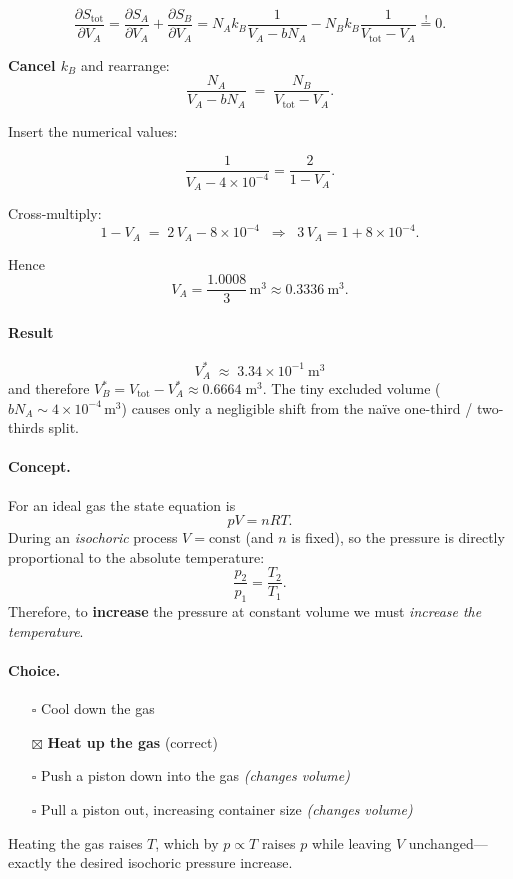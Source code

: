 \documentclass[12pt]{article}
\theoremstyle{definition} %
\theoremstyle{plain} %
\begin{document}
\[
  \frac{\partial S_{\text{tot}}}{\partial V_A}
  = \frac{\partial S_A}{\partial V_A}
    + \frac{\partial S_B}{\partial V_A}
  = N_A k_B \frac{1}{V_A - bN_A}
    - N_B k_B \frac{1}{V_{\text{tot}}-V_A}
  \stackrel{!}{=} 0 .
\]

\textbf{Cancel \(k_B\)} and rearrange:
\[
  \frac{N_A}{V_A - bN_A} \;=\; \frac{N_B}{V_{\text{tot}}-V_A}.
\]

Insert the numerical values:

\[
  \frac{1}{V_A - 4\times10^{-4}}
  = \frac{2}{1 - V_A}.
\]

Cross-multiply:
\[
  1 - V_A \;=\; 2\,V_A - 8\times10^{-4}
  \;\;\Longrightarrow\;\;
  3\,V_A = 1 + 8\times10^{-4}.
\]

Hence
\[
  V_A = \frac{1.0008}{3} \,\text{m}^{3}
       \approx 0.3336~\text{m}^{3}.
\]

\paragraph{Result}
\[
  \boxed{\,V_A^{\ast} \;\approx\; 3.34\times10^{-1}\ \text{m}^{3}\,}
\]
and therefore \(V_B^{\ast} = V_{\text{tot}} - V_A^{\ast} \approx 0.6664\;\text{m}^{3}\).
The tiny excluded volume (\(bN_A \sim 4\times10^{-4}\,\text{m}^{3}\)) causes
only a negligible shift from the naïve one-third / two-thirds split.
\paragraph{Concept.}
For an ideal gas the state equation is
\[
  pV = nRT.
\]
During an \emph{isochoric} process \(V=\text{const}\) (and \(n\) is fixed),
so the pressure is directly proportional to the absolute temperature:
\[
  \frac{p_2}{p_1} = \frac{T_2}{T_1}.
\]
Therefore, to \textbf{increase} the pressure at constant volume we must
\emph{increase the temperature}.

\paragraph{Choice.}
\begin{itemize}
  \item[\(\square\)] Cool down the gas
  \item[\(\boxtimes\)] \textbf{Heat up the gas} \hfill (correct)
  \item[\(\square\)] Push a piston down into the gas \emph{(changes volume)}
  \item[\(\square\)] Pull a piston out, increasing container size
                      \emph{(changes volume)}
\end{itemize}
Heating the gas raises \(T\), which by \(p\propto T\) raises \(p\) while
leaving \(V\) unchanged—exactly the desired isochoric pressure increase.
\end{document}
